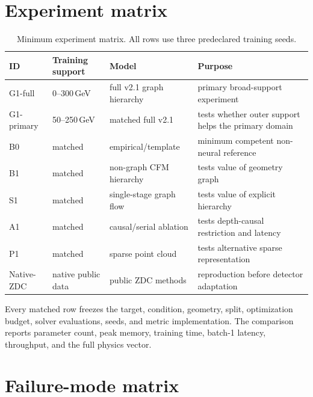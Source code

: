 \documentclass[10pt,a4paper]{article}
\begin{document}
\section{Experiment matrix}

\begin{table}[ht]
\centering
\caption{Minimum experiment matrix. All rows use three predeclared training seeds.}
\begin{tabularx}{\textwidth}{@{}p{}p{}p{}Y@{}}
\toprule
ID & Training support & Model & Purpose \\
\midrule
G1-full & 0--300\,GeV & full v2.1 graph hierarchy & primary broad-support experiment \\
G1-primary & 50--250\,GeV & matched full v2.1 & tests whether outer support helps the primary domain \\
B0 & matched & empirical/template & minimum competent non-neural reference \\
B1 & matched & non-graph CFM hierarchy & tests value of geometry graph \\
S1 & matched & single-stage graph flow & tests value of explicit hierarchy \\
A1 & matched & causal/serial ablation & tests depth-causal restriction and latency \\
P1 & matched & sparse point cloud & tests alternative sparse representation \\
Native-ZDC & native public data & public ZDC methods & reproduction before detector adaptation \\
\bottomrule
\end{tabularx}
\end{table}

Every matched row freezes the target, condition, geometry, split, optimization budget, solver evaluations, seeds, and metric implementation. The comparison reports parameter count, peak memory, training time, batch-1 latency, throughput, and the full physics vector.

\section{Failure-mode matrix}
\end{document}
